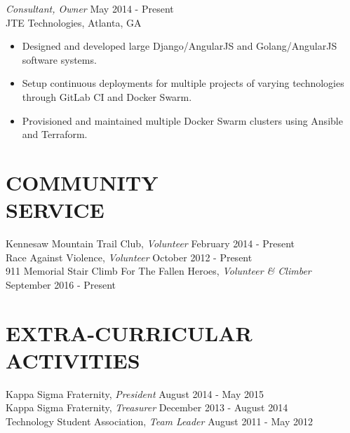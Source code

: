 \documentclass[margin, 10pt]{res} %
\begin{document}
\begin{resume}
{\sl Consultant, Owner} \hfill May 2014 - Present\\
JTE Technologies, Atlanta, GA
\begin{itemize} 
\item Designed and developed large Django/AngularJS and Golang/AngularJS software systems.
\item Setup continuous deployments for multiple projects of varying technologies through GitLab CI and Docker Swarm.
\item Provisioned and maintained multiple Docker Swarm clusters using Ansible and Terraform.
\end{itemize} 



\section{COMMUNITY \\ SERVICE}

Kennesaw Mountain Trail Club, {\sl Volunteer} \hfill February 2014 - Present \\
Race Against Violence, {\sl Volunteer} \hfill October 2012 - Present \\
9\/11 Memorial Stair Climb For The Fallen Heroes, {\sl Volunteer \& Climber} \hfill September 2016 - Present \\


\section{EXTRA-CURRICULAR \\ ACTIVITIES} 

Kappa Sigma Fraternity, {\sl President} \hfill August 2014 - May 2015\\
Kappa Sigma Fraternity, {\sl Treasurer} \hfill December 2013 - August 2014 \\
Technology Student Association, {\sl Team Leader} \hfill August 2011 - May 2012 \\
 


\end{resume}
\end{document}
